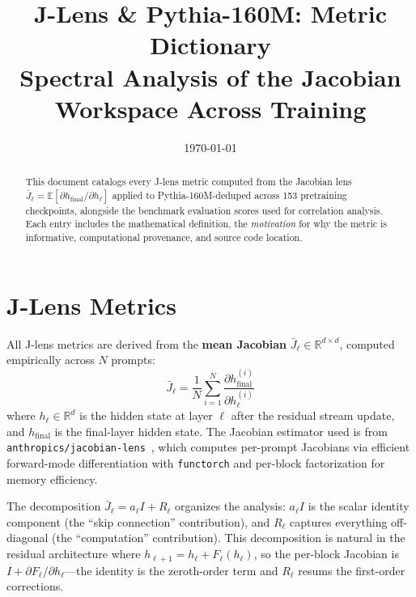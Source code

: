 \documentclass[11pt,a4paper]{article}
\title{\textbf{J-Lens \& Pythia-160M: Metric Dictionary}\\
\large Spectral Analysis of the Jacobian Workspace Across Training}
\author{}
\date{\today}
\begin{document}
\maketitle

\begin{abstract}
This document catalogs every J-lens metric computed from the Jacobian lens $\bar{J}_\ell = \mathbb{E}[\partial h_{\text{final}} / \partial h_\ell]$ applied to Pythia-160M-deduped across 153 pretraining checkpoints, alongside the benchmark evaluation scores used for correlation analysis. Each entry includes the mathematical definition, the \emph{motivation} for why the metric is informative, computational provenance, and source code location.
\end{abstract}

\tableofcontents
\newpage

\section{J-Lens Metrics}

All J-lens metrics are derived from the \textbf{mean Jacobian} $\bar{J}_\ell \in \mathbb{R}^{d \times d}$, computed empirically across $N$ prompts:
\begin{equation}
  \bar{J}_\ell = \frac{1}{N} \sum_{i=1}^{N} \frac{\partial h_{\text{final}}^{(i)}}{\partial h_\ell^{(i)}}
\end{equation}
where $h_\ell \in \mathbb{R}^d$ is the hidden state at layer $\ell$ after the residual stream update, and $h_{\text{final}}$ is the final-layer hidden state. The Jacobian estimator used is from \texttt{anthropics/jacobian-lens}~\cite{jacobian-lens}, which computes per-prompt Jacobians via efficient forward-mode differentiation with \texttt{functorch} and per-block factorization for memory efficiency.

The decomposition $\bar{J}_\ell = a_\ell I + R_\ell$ organizes the analysis: $a_\ell I$ is the scalar identity component (the ``skip connection'' contribution), and $R_\ell$ captures everything off-diagonal (the ``computation'' contribution). This decomposition is natural in the residual architecture where $h_{\ell+1} = h_\ell + F_\ell(h_\ell)$, so the per-block Jacobian is $I + \partial F_\ell / \partial h_\ell$---the identity is the zeroth-order term and $R_\ell$ resums the first-order corrections.
\end{document}
